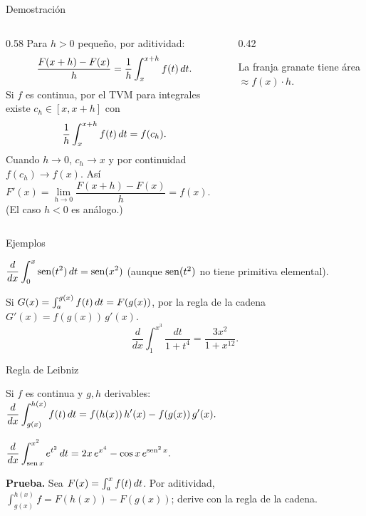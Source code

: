 \documentclass[10pt,aspectratio=169]{beamer}
\begin{document}
\begin{frame}{Demostración}
  \begin{columns}
    \begin{column}{0.58\textwidth}
      Para $h>0$ pequeño, por aditividad:
      \[ \frac{F(x+h)-F(x)}{h}=\frac1h\int_x^{x+h}f(t)\,dt. \]
      Si $f$ es continua, por el TVM para integrales existe $c_h\in[x,x+h]$ con
      \[ \frac1h\int_x^{x+h}f(t)\,dt=f(c_h). \]
      Cuando $h\to0$, $c_h\to x$ y por continuidad $f(c_h)\to f(x)$. Así
      \[ F'(x)=\lim_{h\to0}\frac{F(x+h)-F(x)}{h}=f(x).\qquad\blacksquare \]
      \small (El caso $h<0$ es análogo.)
    \end{column}
    \begin{column}{0.42\textwidth}
      \centering

      \small La franja granate tiene área $\approx f(x)\cdot h$.
    \end{column}
  \end{columns}
\end{frame}

\begin{frame}{Ejemplos}
  \begin{ejemplo}[1]
    $\displaystyle\frac{d}{dx}\int_0^x\operatorname{sen}(t^2)\,dt=\operatorname{sen}(x^2)$ \quad (aunque $\operatorname{sen}(t^2)$ no tiene primitiva elemental).
  \end{ejemplo}
  \begin{ejemplo}
    Si $G(x)=\int_a^{g(x)}f(t)\,dt=F(g(x))$, por la regla de la cadena $G'(x)=f(g(x))\,g'(x)$.
    \[ \frac{d}{dx}\int_1^{x^3}\frac{dt}{1+t^4}=\frac{3x^2}{1+x^{12}}. \]
  \end{ejemplo}
\end{frame}

\begin{frame}{Regla de Leibniz}
  \begin{teorema}
    Si $f$ es continua y $g,h$ derivables:\quad
    $\displaystyle\frac{d}{dx}\int_{g(x)}^{h(x)}f(t)\,dt=f(h(x))\,h'(x)-f(g(x))\,g'(x).$
  \end{teorema}
  \begin{ejemplo}[3]
    $\displaystyle\frac{d}{dx}\int_{\operatorname{sen} x}^{x^2}e^{t^2}\,dt=2x\,e^{x^4}-\cos x\,e^{\operatorname{sen}^2x}.$
  \end{ejemplo}
  \textbf{Prueba.} Sea $F(x)=\int_a^xf(t)\,dt$. Por aditividad,
  $\int_{g(x)}^{h(x)}f=F(h(x))-F(g(x))$; derive con la regla de la cadena.
\end{frame}
\end{document}
